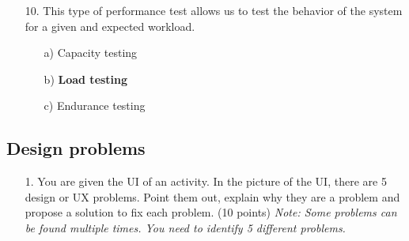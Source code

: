 \documentclass[12pt]{article}
\begin{document}
\begin{itemize}
    \item[10.] This type of performance test allows us to test the behavior of the system for a given and expected workload.
    \begin{itemize}
        \item[a)] Capacity testing
        \item[b)] \textbf{Load testing}
        \item[c)] Endurance testing
    \end{itemize} 

\end{itemize}
\newpage
\subsection*{Design problems}

\begin{itemize}
    \item[1.] You are given the UI of an activity. In the picture of the UI, there are 5 design or UX problems. Point them out, explain why they are a problem and propose a solution to fix each problem. (10 points) 
    \textit{Note: Some problems can be found multiple times. You need to identify 5 different problems.}


\end{itemize}
\end{document}
